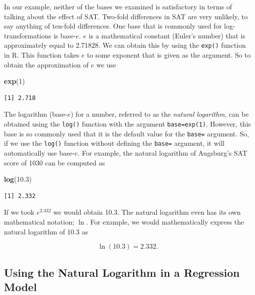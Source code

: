 \documentclass[]{book}
\newenvironment{Shaded}{\begin{snugshade}}{\end{snugshade}}
\newcommand{\DecValTok}[1]{\textcolor[rgb]{0.00,0.00,0.81}{#1}}
\newcommand{\FloatTok}[1]{\textcolor[rgb]{0.00,0.00,0.81}{#1}}
\newcommand{\KeywordTok}[1]{\textcolor[rgb]{0.13,0.29,0.53}{\textbf{#1}}}
\newcommand{\NormalTok}[1]{#1}
\begin{document}
In our example, neither of the bases we examined is satisfactory in terms of talking about the effect of SAT. Two-fold differences in SAT are very unlikely, to say anything of ten-fold differences. One base that is commonly used for log-transformations is base-\(e\). \(e\) is a mathematical constant (Euler's number) that is approximately equal to 2.71828. We can obtain this by using the \texttt{exp()} function in R. This function takes \(e\) to some exponent that is given as the argument. So to obtain the approximation of \(e\) we use

\begin{Shaded}
\begin{Highlighting}[]
\KeywordTok{exp}\NormalTok{(}\DecValTok{1}\NormalTok{)}
\end{Highlighting}
\end{Shaded}

\begin{verbatim}
[1] 2.718
\end{verbatim}

The logarithm (base-\(e\)) for a number, referred to as the \emph{natural logarithm}, can be obtained using the \texttt{log()} function with the argument \texttt{base=exp(1)}. However, this base is so commonly used that it is the default value for the \texttt{base=} argument. So, if we use the \texttt{log()} function without defining the \texttt{base=} argument, it will automatically use base-\(e\). For example, the natural logarithm of Augsburg's SAT score of 1030 can be computed as

\begin{Shaded}
\begin{Highlighting}[]
\KeywordTok{log}\NormalTok{(}\FloatTok{10.3}\NormalTok{)}
\end{Highlighting}
\end{Shaded}

\begin{verbatim}
[1] 2.332
\end{verbatim}

If we took \(e^{2.332}\) we would obtain 10.3. The natural logarithm even has its own mathematical notation; \(\ln\). For example, we would mathematically express the natural logarithm of 10.3 as

\[
\ln (10.3) = 2.332.
\]

\hypertarget{using-the-natural-logarithm-in-a-regression-model}{%
\subsection{Using the Natural Logarithm in a Regression Model}\label{using-the-natural-logarithm-in-a-regression-model}}
\end{document}
